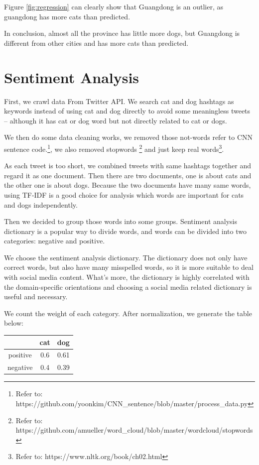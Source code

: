 \documentclass[12pt]{article}
\begin{document}
Figure \ref{fig:regression} can clearly show that Guangdong is an outlier, as guangdong has more cats than predicted.

In conclusion, almost all the province has little more dogs, but Guangdong is different from other cities and has more cats than predicted.

\section{Sentiment Analysis}
First, we crawl data From Twitter API. We search cat and dog hashtags as keywords instead of using cat and dog directly to avoid some meaningless tweets -- although it has cat or dog word but not directly related to cat or dogs.

We then do some data cleaning works, we removed those not-words refer to CNN sentence code.\footnote{Refer to: https://github.com/yoonkim/CNN\_sentence/blob/master/process\_data.py}, we also removed stopwords \footnote{Refer to: https://github.com/amueller/word\_cloud/blob/master/wordcloud/stopwords} and just keep real words\footnote{Refer to: https://www.nltk.org/book/ch02.html}.

As each tweet is too short, we combined tweets with same hashtags together and regard it as one document. Then there are two documents, one is about cats and the other one is about dogs. Because the two documents have many same words, using TF-IDF is a good choice for analysis which words are important for cats and dogs independently.

Then we decided to group those words into some groups. Sentiment analysis dictionary is a popular way to divide words, and words can be divided into two categories: negative and positive.

We choose the sentiment analysis dictionary\cite{hu2004mining}. The dictionary does not only have correct words, but also have many misspelled words, so it is more suitable to deal with social media content. What's more, the dictionary is highly correlated with the domain-specific orientations\cite{liu2010sentiment} and choosing a social media related dictionary is useful and necessary.

We count the weight of each category. After normalization, we generate the table below:

\begin{center}
\begin{tabular}{ |c|c|c| }
 \hline
  & cat & dog \\ \hline
 positive & 0.6 & 0.61 \\ \hline
 negative & 0.4 & 0.39 \\ \hline
\end{tabular}
\end{center}
\end{document}
